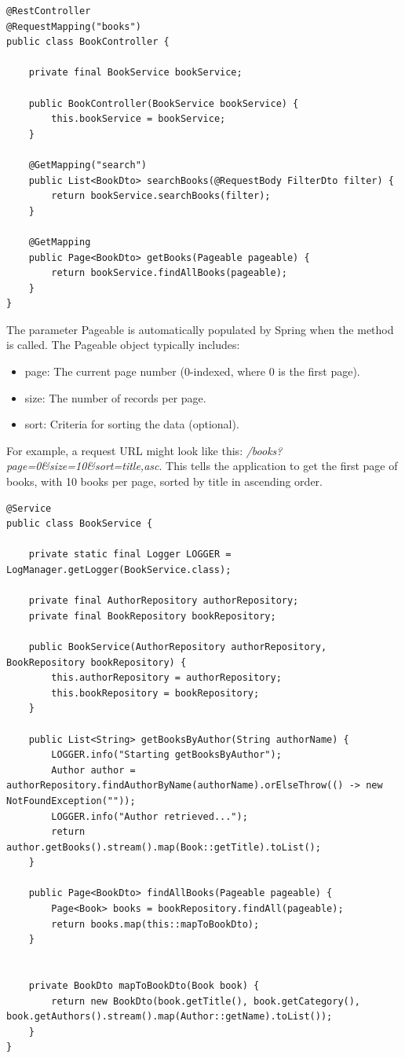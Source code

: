 \begin{lstlisting}
@RestController
@RequestMapping("books")
public class BookController {

    private final BookService bookService;

    public BookController(BookService bookService) {
        this.bookService = bookService;
    }

    @GetMapping("search")
    public List<BookDto> searchBooks(@RequestBody FilterDto filter) {
        return bookService.searchBooks(filter);
    }

    @GetMapping
    public Page<BookDto> getBooks(Pageable pageable) {
        return bookService.findAllBooks(pageable);
    }
}
\end{lstlisting}

The parameter Pageable is automatically populated by Spring when the method is called. The Pageable object typically includes:
\begin{itemize}
\item page: The current page number (0-indexed, where 0 is the first page).
\item size: The number of records per page.
\item sort: Criteria for sorting the data (optional).
\end{itemize}

For example, a request URL might look like this: \textit{/books?page=0\&size=10\&sort=title,asc}. This tells the application to get the first page of books, with 10 books per page, sorted by title in ascending order.

\begin{lstlisting}
@Service
public class BookService {

    private static final Logger LOGGER = LogManager.getLogger(BookService.class);

    private final AuthorRepository authorRepository;
    private final BookRepository bookRepository;

    public BookService(AuthorRepository authorRepository, BookRepository bookRepository) {
        this.authorRepository = authorRepository;
        this.bookRepository = bookRepository;
    }

    public List<String> getBooksByAuthor(String authorName) {
        LOGGER.info("Starting getBooksByAuthor");
        Author author = authorRepository.findAuthorByName(authorName).orElseThrow(() -> new NotFoundException(""));
        LOGGER.info("Author retrieved...");
        return author.getBooks().stream().map(Book::getTitle).toList();
    }

    public Page<BookDto> findAllBooks(Pageable pageable) {
        Page<Book> books = bookRepository.findAll(pageable);
        return books.map(this::mapToBookDto);
    }


    private BookDto mapToBookDto(Book book) {
        return new BookDto(book.getTitle(), book.getCategory(), book.getAuthors().stream().map(Author::getName).toList());
    }
}
\end{lstlisting}

